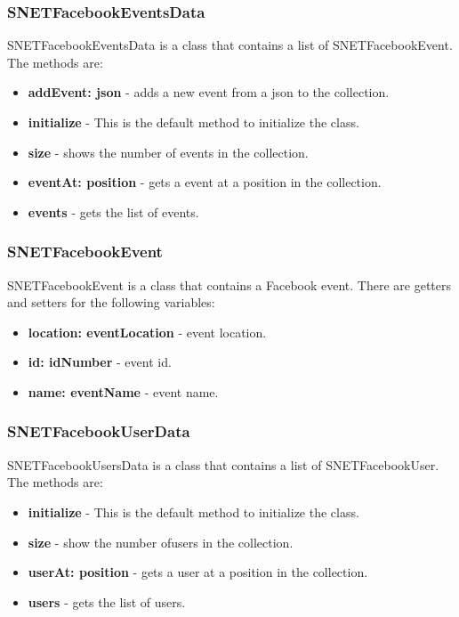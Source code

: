 \subsubsection{SNETFacebookEventsData}
\label{sec-1-5-12}
SNETFacebookEventsData is a class that contains a list of SNETFacebookEvent. The methods are:
\begin{itemize}
\item \textbf{addEvent: json} - adds a new event from a json to the collection.
\item \textbf{initialize} - This is the default method to initialize the class.
\item \textbf{size} - shows the number of events in the collection.
\item \textbf{eventAt: position} - gets a event at a position in the collection.
\item \textbf{events} - gets the list of events.
\end{itemize}


\subsubsection{SNETFacebookEvent}
\label{sec-1-5-13}
SNETFacebookEvent is a class that contains a Facebook event. There are getters and setters for the following variables:
\begin{itemize}
\item \textbf{location: eventLocation} - event location.
\item \textbf{id: idNumber} - event id.
\item \textbf{name: eventName} - event name.
\end{itemize}


\subsubsection{SNETFacebookUserData}
\label{sec-1-5-14}
SNETFacebookUsersData is a class that contains a list of SNETFacebookUser. The methods are:
\begin{itemize}
\item \textbf{initialize} - This is the default method to initialize the class.
\item \textbf{size} - show the number ofusers in the collection.
\item \textbf{userAt: position} - gets a user at a position in the collection.
\item \textbf{users} - gets the list of users.
\end{itemize}

